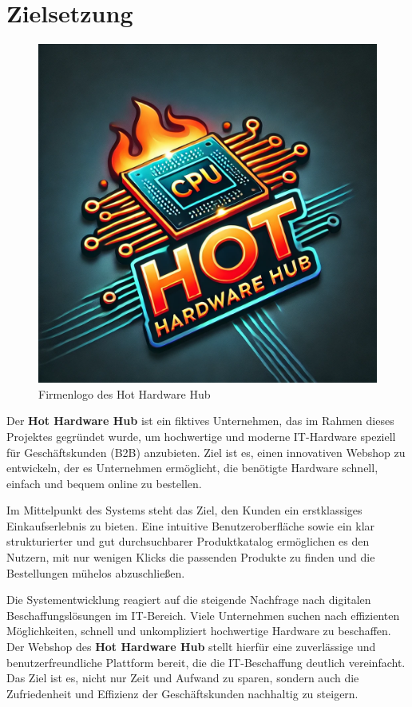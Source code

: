 \documentclass[%
	12pt,
	a4paper,
	oneside,
	parskip=full
]{scrbook}
\begin{document}
\chapter{Zielsetzung}
\begin{figure}[ht]
	\centering
	\includegraphics[width=0.5\linewidth]{"Media/Hot Hardware Hub Logo"}
	\caption[Logo Hot Hardware Hub]{Firmenlogo des Hot Hardware Hub}
	\label{fig:hot-hardware-hub-logo}
\end{figure}
Der \textbf{Hot Hardware Hub} ist ein fiktives Unternehmen, das im Rahmen dieses Projektes gegründet wurde, um hochwertige und moderne IT-Hardware speziell für Geschäftskunden (B2B) anzubieten.
Ziel ist es, einen innovativen Webshop zu entwickeln, der es Unternehmen ermöglicht, die benötigte Hardware schnell, einfach und bequem online zu bestellen.

Im Mittelpunkt des Systems steht das Ziel, den Kunden ein erstklassiges Einkaufserlebnis zu bieten.
Eine intuitive Benutzeroberfläche sowie ein klar strukturierter und gut durchsuchbarer Produktkatalog ermöglichen es den Nutzern, mit nur wenigen Klicks die passenden Produkte zu finden und die Bestellungen mühelos abzuschließen.

Die Systementwicklung reagiert auf die steigende Nachfrage nach digitalen Beschaffungslösungen im IT-Bereich.
Viele Unternehmen suchen nach effizienten Möglichkeiten, schnell und unkompliziert hochwertige Hardware zu beschaffen.
Der Webshop des \textbf{Hot Hardware Hub} stellt hierfür eine zuverlässige und benutzerfreundliche Plattform bereit, die die IT-Beschaffung deutlich vereinfacht.
Das Ziel ist es, nicht nur Zeit und Aufwand zu sparen, sondern auch die Zufriedenheit und Effizienz der Geschäftskunden nachhaltig zu steigern.
\end{document}

